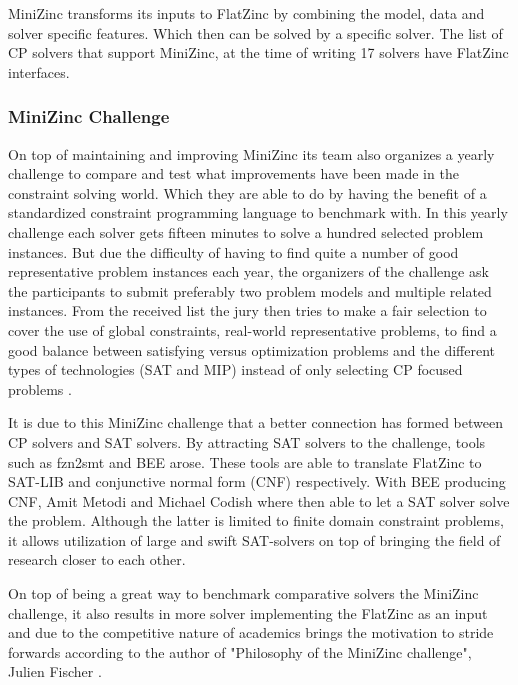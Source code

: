 MiniZinc transforms its inputs to FlatZinc by combining the model, data and solver specific features. Which then can be solved by a specific solver. The list of CP solvers that support MiniZinc, at the time of writing 17 solvers have FlatZinc interfaces.

\subsubsection{MiniZinc Challenge}
On top of maintaining and improving MiniZinc its team also organizes a yearly challenge to compare and test what improvements have been made in the constraint solving world. Which they are able to do by having the benefit of a standardized constraint programming language to benchmark with. 
In this yearly challenge each solver gets fifteen minutes to solve a hundred selected problem instances. But due the difficulty of having to find quite a number of good representative problem instances each year, the organizers of the challenge ask the participants to submit preferably two problem models and multiple related instances. From the received list the jury then tries to make a fair selection to cover the use of global constraints, real-world representative problems, to find a good balance between satisfying versus optimization problems and the different types of technologies (SAT and MIP) instead of only selecting CP focused problems \cite{58stuckey2014minizinc}.

It is due to this MiniZinc challenge that a better connection has formed between CP solvers and SAT solvers. By attracting SAT solvers to the challenge, tools such as fzn2smt \cite{72bofill2010system} and BEE \cite{69BEEmetodi2012compiling} arose. These tools are able to translate FlatZinc to SAT-LIB and conjunctive normal form (CNF) respectively. 
With BEE producing CNF, Amit Metodi and Michael Codish where then able to let a SAT solver solve the problem. Although the latter is limited to finite domain constraint problems, it allows utilization of large and swift SAT-solvers on top of bringing the field of research closer to each other.

On top of being a great way to benchmark comparative solvers the MiniZinc challenge, it also results in more solver implementing the FlatZinc as an input and due to the competitive nature of academics brings the motivation to stride forwards according to the author of "Philosophy of the MiniZinc challenge", Julien Fischer \cite{59stuckey2010philosophy}.

